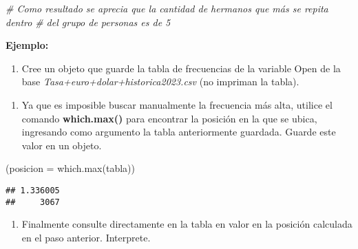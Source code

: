 \documentclass[
]{book}
\newenvironment{Shaded}{\begin{snugshade}}{\end{snugshade}}
\newcommand{\AttributeTok}[1]{\textcolor[rgb]{0.77,0.63,0.00}{#1}}
\newcommand{\CommentTok}[1]{\textcolor[rgb]{0.56,0.35,0.01}{\textit{#1}}}
\newcommand{\FunctionTok}[1]{\textcolor[rgb]{0.00,0.00,0.00}{#1}}
\newcommand{\NormalTok}[1]{#1}
\newcommand{\OtherTok}[1]{\textcolor[rgb]{0.56,0.35,0.01}{#1}}
\newcommand{\SpecialCharTok}[1]{\textcolor[rgb]{0.00,0.00,0.00}{#1}}
\providecommand{\tightlist}{%
  \setlength{\itemsep}{0pt}\setlength{\parskip}{0pt}}
\begin{document}
\begin{Shaded}
\begin{Highlighting}[]
\CommentTok{\# Como resultado se aprecia que la cantidad de hermanos que más se repita dentro }
\CommentTok{\# del grupo de personas es de 5}
\end{Highlighting}
\end{Shaded}

\textbf{Ejemplo:}

\begin{enumerate}
\def\labelenumi{\arabic{enumi}.}
\tightlist
\item
  Cree un objeto que guarde la tabla de frecuencias de la variable Open de la base \emph{Tasa+euro+dolar+historica2023.csv} (no impriman la tabla).
\end{enumerate}

\begin{Shaded}
\end{Shaded}

\begin{enumerate}
\def\labelenumi{\arabic{enumi}.}
\setcounter{enumi}{1}
\tightlist
\item
  Ya que es imposible buscar manualmente la frecuencia más alta, utilice el comando \textbf{which.max()} para encontrar la posición en la que se ubica, ingresando como argumento la tabla anteriormente guardada. Guarde este valor en un objeto.
\end{enumerate}

\begin{Shaded}
\begin{Highlighting}[]
\NormalTok{(}\AttributeTok{posicion =} \FunctionTok{which.max}\NormalTok{(tabla))}
\end{Highlighting}
\end{Shaded}

\begin{verbatim}
## 1.336005 
##     3067
\end{verbatim}

\begin{enumerate}
\def\labelenumi{\arabic{enumi}.}
\setcounter{enumi}{2}
\tightlist
\item
  Finalmente consulte directamente en la tabla en valor en la posición calculada en el paso anterior. Interprete.
\end{enumerate}
\end{document}
